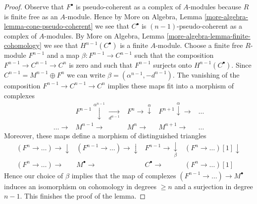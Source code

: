 \begin{proof}
Observe that $F^\bullet$ is pseudo-coherent as a complex of $A$-modules
because $R$ is finite free as an $A$-module. Hence
by More on Algebra, Lemma \ref{more-algebra-lemma-cone-pseudo-coherent}
we see that $C^\bullet$ is $(n - 1)$-pseudo-coherent as a complex of
$A$-modules. By
More on Algebra, Lemma \ref{more-algebra-lemma-finite-cohomology}
we see that $H^{n - 1}(C^\bullet)$ is a finite $A$-module.
Choose a finite free $R$-module $F^{n - 1}$ and a map
$\beta : F^{n - 1} \to C^{n - 1}$ such that the composition
$F^{n - 1} \to C^{n - 1} \to C^n$ is zero and such that $F^{n - 1}$
surjects onto $H^{n - 1}(C^\bullet)$. Since
$C^{n - 1} = M^{n - 1} \oplus F^n$
we can write $\beta = (\alpha^{n - 1}, -d^{n - 1})$. The vanishing of the
composition $F^{n - 1} \to C^{n - 1} \to C^n$ implies
these maps fit into a morphism of complexes
$$
\begin{array}{ccccc} & F^{n - 1} \overset{\alpha^{n - 1}}{\downarrow}\underset{d^{n - 1}}{\longrightarrow} & F^n \longrightarrow\overset{\alpha}{\downarrow} & F^{n + 1} \overset{\alpha}{\downarrow}\longrightarrow & \ldots \\ \ldots \longrightarrow & M^{n - 1} \longrightarrow & M^n \longrightarrow & M^{n + 1} \longrightarrow & \ldots\end{array}
$$
Moreover, these maps define a morphism of distinguished triangles
$$
\begin{array}{cccc}(F^n \to \ldots) \longrightarrow\downarrow & (F^{n - 1} \to \ldots) \longrightarrow\downarrow & F^{n - 1} \longrightarrow\underset{\beta}{\downarrow} & (F^n \to \ldots)[1] \downarrow \\ (F^n \to \ldots) \longrightarrow & M^\bullet \longrightarrow & C^\bullet \longrightarrow & (F^n \to \ldots)[1]\end{array}
$$
Hence our choice of $\beta$ implies that the map of complexes
$(F^{n - 1} \to \ldots) \to M^\bullet$ induces an isomorphism on
cohomology in degrees $\geq n$ and a surjection in degree $n - 1$.
This finishes the proof of the lemma.
\end{proof}

